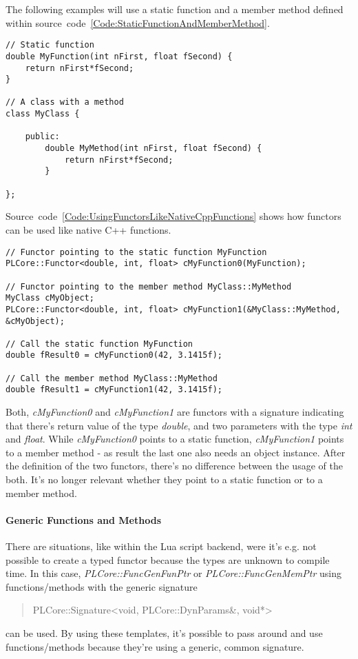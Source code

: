 The following examples will use a static function and a member method defined within source~code~\ref{Code:StaticFunctionAndMemberMethod}.
\begin{lstlisting}[float=htb,label=Code:StaticFunctionAndMemberMethod,caption={Static function and member method}]
// Static function
double MyFunction(int nFirst, float fSecond) {
	return nFirst*fSecond;
}

// A class with a method
class MyClass {

	public:
		double MyMethod(int nFirst, float fSecond) {
			return nFirst*fSecond;
		}

};
\end{lstlisting}
Source~code~\ref{Code:UsingFunctorsLikeNativeCppFunctions} shows how functors can be used like native C++ functions.
\begin{lstlisting}[float=htb,label=Code:UsingFunctorsLikeNativeCppFunctions,caption={Using functors like native C++ functions}]
// Functor pointing to the static function MyFunction
PLCore::Functor<double, int, float> cMyFunction0(MyFunction);

// Functor pointing to the member method MyClass::MyMethod
MyClass cMyObject;
PLCore::Functor<double, int, float> cMyFunction1(&MyClass::MyMethod, &cMyObject);

// Call the static function MyFunction
double fResult0 = cMyFunction0(42, 3.1415f);

// Call the member method MyClass::MyMethod
double fResult1 = cMyFunction1(42, 3.1415f);
\end{lstlisting}
Both, \emph{cMyFunction0} and \emph{cMyFunction1} are functors with a signature indicating that there's return value of the type \emph{double}, and two parameters with the type \emph{int} and \emph{float}. While \emph{cMyFunction0} points to a static function, \emph{cMyFunction1} points to a member method - as result the last one also needs an object instance. After the definition of the two functors, there's no difference between the usage of the both. It's no longer relevant whether they point to a static function or to a member method.


\paragraph{Generic Functions and Methods}
There are situations, like within the Lua script backend, were it's e.g. not possible to create a typed functor because the types are unknown to compile time. In this case, \emph{PLCore::FuncGenFunPtr} or \emph{PLCore::FuncGenMemPtr} using functions/methods with the generic signature \begin{quote}PLCore::Signature<void, PLCore::DynParams\&, void*>\end{quote} can be used. By using these templates, it's possible to pass around and use functions/methods because they're using a generic, common signature.


